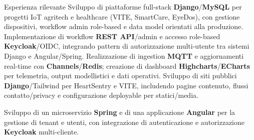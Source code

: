 \begin{rubric}{Esperienza rilevante}
\entry*%
 Sviluppo di piattaforme full-stack \textbf{Django}/\textbf{MySQL} per progetti IoT agritech e healthcare (VITE, SmartCare, EyeDos), con gestione dispositivi, workflow admin role-based e data model orientati alla produzione.
\entry*%
 Implementazione di workflow \textbf{REST API}/admin e accesso role-based \textbf{Keycloak}/OIDC, integrando pattern di autorizzazione multi-utente tra sistemi Django e Angular/Spring.
\entry*%
 Realizzazione di ingestion \textbf{MQTT} e aggiornamenti real-time con \textbf{Channels}/\textbf{Redis}; creazione di dashboard \textbf{Highcharts}/\textbf{ECharts} per telemetria, output modellistici e dati operativi.
\entry*%
 Sviluppo di siti pubblici \textbf{Django}/Tailwind per HeartSentry e VITE, includendo pagine contenuto, flussi contatto/privacy e configurazione deployable per statici/media.

%
\entry*%
 Sviluppo di un microservizio \textbf{Spring} e di una applicazione \textbf{Angular} per la gestione di tenant e utenti, con integrazione di autenticazione e autorizzazione \textbf{Keycloak} multi-cliente.
%
\end{rubric}
